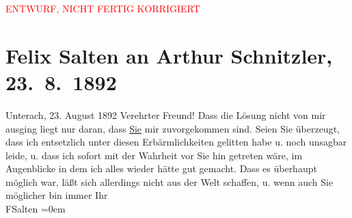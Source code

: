 
\begin{center}
            \textcolor{red}{ENTWURF, NICHT FERTIG KORRIGIERT}
                      \end{center}
            
         \renewcommand{\erwaehnteOrte}{Orte: Bahnhof, Unterach am Attersee, Wien}
         \renewcommand{\erwaehnteWerke}{}
               \section[Felix Salten an Arthur Schnitzler, 23. 8. 1892]{ Felix Salten an Arthur Schnitzler, 23. 8. 1892}\nopagebreak{}\rehead{ }\begin{ledgroupsized}[t]{13cm}\normalsize\beginnumbering \toendnotes[C]{\smallbreak\pagebreak[2]} 
\pstart
           \raggedleft{}{\pb}Unterach, 23. August 1892\pend
           \pstart
           Verehrter Freund! Dass die Lösung nicht von mir ausging liegt nur
               daran, dass \uline{Sie} mir zuvorgekommen sind. Seien Sie
               überzeugt, dass ich entsetzlich unter diesen Erbärmlichkeiten gelitten habe u. noch
               unsagbar leide, u. dass ich sofort mit der Wahrheit vor Sie hin getreten wäre, im
               Augenblicke in dem ich alles wieder hätte gut gemacht. \pend
           \pstart
           Dass es überhaupt möglich war, läßt sich allerdings nicht aus der Welt schaffen, u.
               wenn auch Sie möglicher {\pb}bin
               immer\pend
           \pstart
           Ihr {\\[\baselineskip]}\spacefill\mbox{FSalten}\pend
           \leftskip=0em{}
         
         \endnumbering{}\end{ledgroupsized}\begin{anhang}\end{anhang}\newcommand{\dateiname}{L03113}\newcommand{\titel}{Felix Salten an Arthur Schnitzler, 23. 8. 1892}\newcommand{\editorInnen}{Martin Anton Müller und Laura Untner}
      